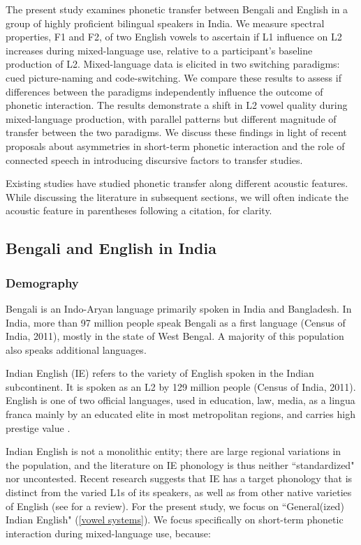 \documentclass[12 pt]{article}
\begin{document}
The present study examines phonetic transfer between Bengali and English in a group of highly proficient bilingual speakers in India. We measure spectral properties, F1 and F2, of two English vowels to ascertain if L1 influence on L2 increases during mixed-language use, relative to a participant's baseline production of L2. Mixed-language data is elicited in two switching paradigms: cued picture-naming and code-switching. We compare these results to assess if differences between the paradigms independently influence the outcome of phonetic interaction. The results demonstrate a shift in L2 vowel quality during mixed-language production, with parallel patterns but different magnitude of transfer between the two paradigms. We discuss these findings in light of recent proposals about asymmetries in short-term phonetic interaction and the role of connected speech in introducing discursive factors to transfer studies.

Existing studies have studied phonetic transfer along different acoustic features. While discussing the literature in subsequent sections, we will often indicate the acoustic feature in parentheses following a citation, for clarity. 

\subsection{Bengali and English in India} \label{bengali_english_in_india}

\subsubsection*{Demography} 

Bengali is an Indo-Aryan language primarily spoken in India and Bangladesh. In India, more than 97 million people speak Bengali as a first language (Census of India, 2011), mostly in the state of West Bengal. A majority of this population also speaks additional languages.

Indian English (IE) refers to the variety of English spoken in the Indian subcontinent. It is spoken as an L2 by 129 million people (Census of India, 2011).  English is one of two official languages, used in education, law, media, as a lingua franca mainly by an educated elite in most metropolitan regions, and carries high prestige value \citep{pandey201517, kachru1981english, tollefson2014language, kachru1983indianization}.

Indian English is not a monolithic entity; there are large regional variations in the population, and the literature on IE phonology is thus neither ``standardized" nor uncontested. Recent research suggests that IE has a target phonology that is distinct from the varied L1s of its speakers, as well as from other native varieties of English (see \cite{sirsa2013effects} for a review). For the present study, we focus on ``General(ized) Indian English" \citep{masica1972sound} (\ref{vowel systems}). We focus specifically on short-term phonetic interaction during mixed-language use, because:
\end{document}
